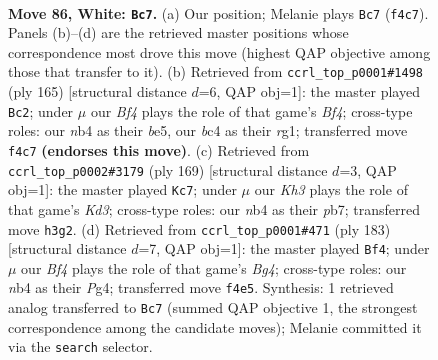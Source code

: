 \documentclass[11pt]{article}
\begin{document}
\clearpage

\begin{figure}[p]\centering
\begin{subfigure}{0.46\textwidth}\centering
\resizebox{\linewidth}{!}{%
\newchessgame
\chessboard[
  setfen={7k/8/8/8/1nb2B2/7K/5P2/8 w - - 17 86},
  showmover=false,
  pgfstyle=straightmove, color=movearrow, markmove={f4-c7}
]}
\caption{}
\end{subfigure}\hfill
\begin{subfigure}{0.46\textwidth}\centering
\resizebox{\linewidth}{!}{%
\newchessgame
\chessboard[
  setfen={8/5p2/7k/4Bb2/8/4K3/8/6R1 b - - 0 83},
  showmover=false,
  pgfstyle=straightmove, color=movearrow, markmove={f5-c2}
]}
\caption{}
\end{subfigure}
\\[4pt]
\begin{subfigure}{0.46\textwidth}\centering
\resizebox{\linewidth}{!}{%
\newchessgame
\chessboard[
  setfen={8/1P5p/3k3b/8/6K1/8/5B2/8 b - - 0 85},
  showmover=false,
  pgfstyle=straightmove, color=movearrow, markmove={d6-c7}
]}
\caption{}
\end{subfigure}\hfill
\begin{subfigure}{0.46\textwidth}\centering
\resizebox{\linewidth}{!}{%
\newchessgame
\chessboard[
  setfen={8/8/6p1/3k2b1/6p1/8/6K1/4B3 b - - 17 92},
  showmover=false,
  pgfstyle=straightmove, color=movearrow, markmove={g5-f4}
]}
\caption{}
\end{subfigure}
\caption{\textbf{Move 86, White: \texttt{Bc7}.} (a) Our position; Melanie plays \texttt{Bc7} (\texttt{f4c7}). Panels (b)--(d) are the retrieved master positions whose correspondence most drove this move (highest QAP objective among those that transfer to it). (b) Retrieved from \texttt{ccrl\_top\_p0001\#1498} (ply 165) [structural distance $d$=6, QAP obj=1]: the master played \texttt{Bc2}; under $\mu$ our \emph{Bf4} plays the role of that game's \emph{Bf4}; cross-type roles: our \emph{n}b4 as their \emph{b}e5, our \emph{b}c4 as their \emph{r}g1; transferred move \texttt{f4c7} \textbf{(endorses this move)}. (c) Retrieved from \texttt{ccrl\_top\_p0002\#3179} (ply 169) [structural distance $d$=3, QAP obj=1]: the master played \texttt{Kc7}; under $\mu$ our \emph{Kh3} plays the role of that game's \emph{Kd3}; cross-type roles: our \emph{n}b4 as their \emph{p}b7; transferred move \texttt{h3g2}. (d) Retrieved from \texttt{ccrl\_top\_p0001\#471} (ply 183) [structural distance $d$=7, QAP obj=1]: the master played \texttt{Bf4}; under $\mu$ our \emph{Bf4} plays the role of that game's \emph{Bg4}; cross-type roles: our \emph{n}b4 as their \emph{P}g4; transferred move \texttt{f4e5}. Synthesis: 1 retrieved analog transferred to \texttt{Bc7} (summed QAP objective 1, the strongest correspondence among the candidate moves); Melanie committed it via the \texttt{search} selector.}
\label{fig:thought-m170}
\end{figure}
\end{document}
